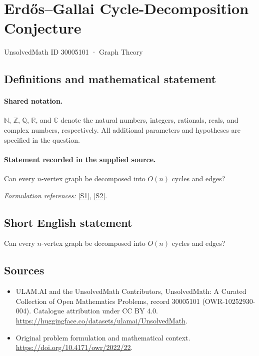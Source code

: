 \documentclass[11pt]{article}
\newcommand{\sref}[2]{\hyperlink{source:#1:#2}{[S#2]}}
\begin{document}
\setcounter{section}{30005100}
\section{Erdős–Gallai Cycle-Decomposition Conjecture}\label{30005101}
{\small UnsolvedMath ID 30005101 · Graph Theory}
\subsection{Definitions and mathematical statement}

\paragraph{Shared notation.}$\mathbb N$, $\mathbb Z$, $\mathbb Q$, $\mathbb R$, and $\mathbb C$ denote the natural numbers, integers, rationals, reals, and complex numbers, respectively. All additional parameters and hypotheses are specified in the question.


\paragraph{Statement recorded in the supplied source.}
Can every $n$-vertex graph be decomposed into $O(n)$ cycles and edges?
\par\smallskip\textit{Formulation references:} \sref{30005101}{1}, \sref{30005101}{2}.
\subsection{Short English statement}
Can every $n$-vertex graph be decomposed into $O(n)$ cycles and edges?
\subsection{Sources}
\begin{itemize}
\item[\hypertarget{source:30005101:1}{S1}] ULAM.AI and the UnsolvedMath Contributors, UnsolvedMath: A Curated Collection of Open Mathematics Problems, record 30005101 (OWR-10252930-004). Catalogue attribution under CC BY 4.0.
\url{https://huggingface.co/datasets/ulamai/UnsolvedMath}.
\item[\hypertarget{source:30005101:2}{S2}] Original problem formulation and mathematical context.
\url{https://doi.org/10.4171/owr/2022/22}.
\end{itemize}
\label{end:30005101}
\end{document}
